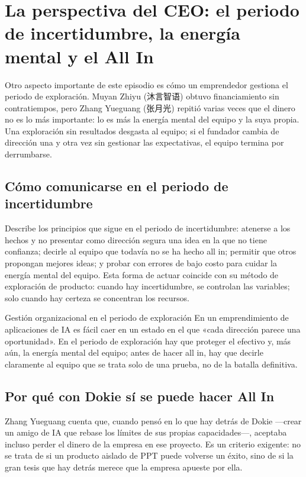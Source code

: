 \section{La perspectiva del CEO: el periodo de incertidumbre, la energía mental y el All In}

Otro aspecto importante de este episodio es cómo un emprendedor gestiona el periodo de exploración. Muyan Zhiyu (沐言智语) obtuvo financiamiento sin contratiempos, pero Zhang Yueguang (张月光) repitió varias veces que el dinero no es lo más importante: lo es más la energía mental del equipo y la suya propia. Una exploración sin resultados desgasta al equipo; si el fundador cambia de dirección una y otra vez sin gestionar las expectativas, el equipo termina por derrumbarse.

\subsection{Cómo comunicarse en el periodo de incertidumbre}

Describe los principios que sigue en el periodo de incertidumbre: atenerse a los hechos y no presentar como dirección segura una idea en la que no tiene confianza; decirle al equipo que todavía no se ha hecho all in; permitir que otros propongan mejores ideas; y probar con errores de bajo costo para cuidar la energía mental del equipo. Esta forma de actuar coincide con su método de exploración de producto: cuando hay incertidumbre, se controlan las variables; solo cuando hay certeza se concentran los recursos.

\begin{knowledgebox}{Gestión organizacional en el periodo de exploración}
En un emprendimiento de aplicaciones de IA es fácil caer en un estado en el que «cada dirección parece una oportunidad». En el periodo de exploración hay que proteger el efectivo y, más aún, la energía mental del equipo; antes de hacer all in, hay que decirle claramente al equipo que se trata solo de una prueba, no de la batalla definitiva.
\end{knowledgebox}

\subsection{Por qué con Dokie sí se puede hacer All In}

Zhang Yueguang cuenta que, cuando pensó en lo que hay detrás de Dokie ---crear un amigo de IA que rebase los límites de sus propias capacidades---, aceptaba incluso perder el dinero de la empresa en ese proyecto. Es un criterio exigente: no se trata de si un producto aislado de PPT puede volverse un éxito, sino de si la gran tesis que hay detrás merece que la empresa apueste por ella.

